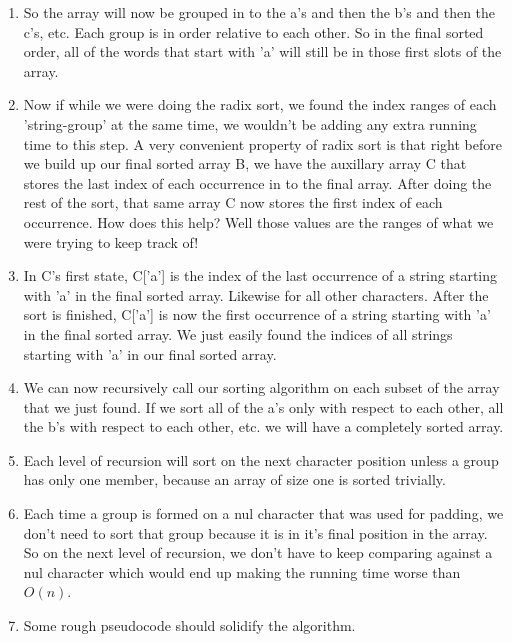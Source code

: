 \documentclass[a4paper,12pt]{article}
\begin{document}
\begin{enumerate}[]

\item So the array will now be grouped in to the a's and then the b's
  and then the c's, etc. Each group is in order relative to each
  other. So in the final sorted order, all of the words that start
  with 'a' will still be in those first slots of the array.

\item Now if while we were doing the radix sort, we found the index
  ranges of each 'string-group' at the same time, we wouldn't be
  adding any extra running time to this step. A very convenient
  property of radix sort is that right before we build up our final
  sorted array B, we have the auxillary array C that stores the last
  index of each occurrence in to the final array. After doing the rest
  of the sort, that same array C now stores the first index of each
  occurrence. How does this help?  Well those values are the ranges of
  what we were trying to keep track of!

\item In C's first state, C['a'] is the index of the last occurrence
  of a string starting with 'a' in the final sorted array. Likewise
  for all other characters. After the sort is finished, C['a'] is now
  the first occurrence of a string starting with 'a' in the final
  sorted array. We just easily found the indices of all strings
  starting with 'a' in our final sorted array.

\item We can now recursively call our sorting algorithm on each subset
  of the array that we just found. If we sort all of the a's only with
  respect to each other, all the b's with respect to each other,
  etc. we will have a completely sorted array.

\item Each level of recursion will sort on the next character position
  unless a group has only one member, because an array of size one is
  sorted trivially. 

\item Each time a group is formed on a nul character that was used for
  padding, we don't need to sort that group because it is in it's
  final position in the array. So on the next level of recursion, we
  don't have to keep comparing against a nul character which would end
  up making the running time worse than $O(n)$.

\item Some rough pseudocode should solidify the algorithm.
  

\end{enumerate}
\end{document}
